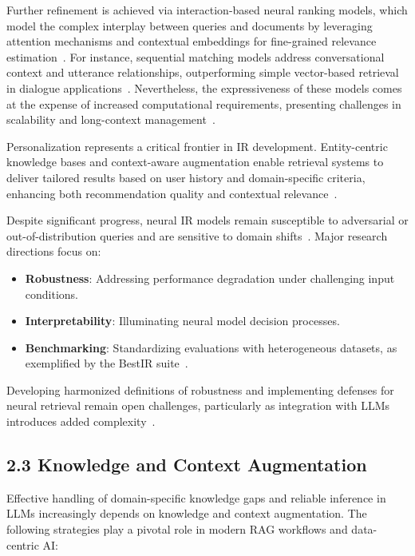 \documentclass[11pt]{article}
\begin{document}
Further refinement is achieved via interaction-based neural ranking models, which model the complex interplay between queries and documents by leveraging attention mechanisms and contextual embeddings for fine-grained relevance estimation~\cite{ref5,ref8,ref10,ref14,ref15,ref16,ref17,ref22,ref26,ref28,ref36,ref37,ref38,ref43,ref52,ref54,ref55}. For instance, sequential matching models address conversational context and utterance relationships, outperforming simple vector-based retrieval in dialogue applications~\cite{ref43}. Nevertheless, the expressiveness of these models comes at the expense of increased computational requirements, presenting challenges in scalability and long-context management~\cite{ref54,ref55}.

Personalization represents a critical frontier in IR development. Entity-centric knowledge bases and context-aware augmentation enable retrieval systems to deliver tailored results based on user history and domain-specific criteria, enhancing both recommendation quality and contextual relevance~\cite{ref8,ref10,ref14,ref15,ref17,ref26,ref28,ref38,ref43,ref52,ref54}.

Despite significant progress, neural IR models remain susceptible to adversarial or out-of-distribution queries and are sensitive to domain shifts~\cite{ref7,ref20,ref46,ref54,ref63,ref64}. Major research directions focus on:

\begin{itemize}
  \item \textbf{Robustness}: Addressing performance degradation under challenging input conditions.
  \item \textbf{Interpretability}: Illuminating neural model decision processes.
  \item \textbf{Benchmarking}: Standardizing evaluations with heterogeneous datasets, as exemplified by the BestIR suite~\cite{ref7,ref63,ref64}.
\end{itemize}

Developing harmonized definitions of robustness and implementing defenses for neural retrieval remain open challenges, particularly as integration with LLMs introduces added complexity~\cite{ref7,ref63,ref64}.

\subsection{2.3 Knowledge and Context Augmentation}

Effective handling of domain-specific knowledge gaps and reliable inference in LLMs increasingly depends on knowledge and context augmentation. The following strategies play a pivotal role in modern RAG workflows and data-centric AI:
\end{document}
